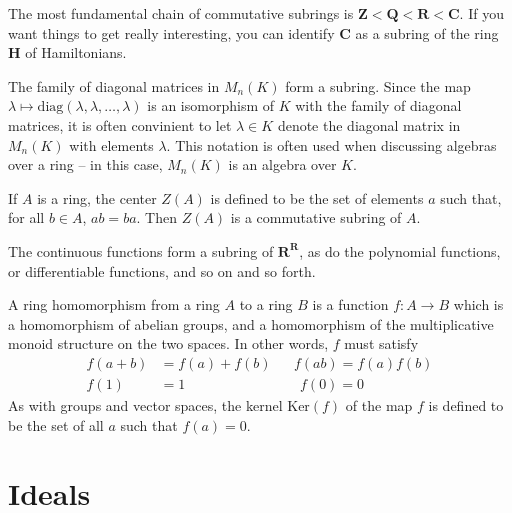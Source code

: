 \begin{example}
    The most fundamental chain of commutative subrings is $\mathbf{Z} < \mathbf{Q} < \mathbf{R} < \mathbf{C}$. If you want things to get really interesting, you can identify $\mathbf{C}$ as a subring of the ring $\mathbf{H}$ of Hamiltonians.
\end{example}

\begin{example}
    The family of diagonal matrices in $M_n(K)$ form a subring. Since the map $\lambda \mapsto \text{diag}(\lambda, \lambda, \dots, \lambda)$ is an isomorphism of $K$ with the family of diagonal matrices, it is often convinient to let $\lambda \in K$ denote the diagonal matrix in $M_n(K)$ with elements $\lambda$. This notation is often used when discussing algebras over a ring -- in this case, $M_n(K)$ is an algebra over $K$.
\end{example}

\begin{example}
    If $A$ is a ring, the center $Z(A)$ is defined to be the set of elements $a$ such that, for all $b \in A$, $ab = ba$. Then $Z(A)$ is a commutative subring of $A$.
\end{example}

\begin{example}
    The continuous functions form a subring of $\mathbf{R}^\mathbf{R}$, as do the polynomial functions, or differentiable functions, and so on and so forth.
\end{example}

A ring homomorphism from a ring $A$ to a ring $B$ is a function $f:A \to B$ which is a homomorphism of abelian groups, and a homomorphism of the multiplicative monoid structure on the two spaces. In other words, $f$ must satisfy
%
\begin{align*}
    f(a + b) &= f(a) + f(b) && f(ab) = f(a)f(b)\\
    f(1) &= 1 && \ \ f(0) = 0
\end{align*}
%
As with groups and vector spaces, the kernel $\text{Ker}(f)$ of the map $f$ is defined to be the set of all $a$ such that $f(a) = 0$.





\section{Ideals}

